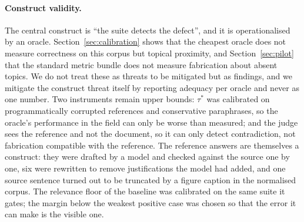 \documentclass[a4paper,fleqn]{cas-dc}
\begin{document}
\paragraph{Construct validity.} The central construct is ``the suite detects
the defect'', and it is operationalised by an oracle. Section~\ref{sec:calibration}
shows that the cheapest oracle does not measure correctness on this corpus but
topical proximity, and Section~\ref{sec:pilot} that the standard metric bundle
does not measure fabrication about absent topics. We do not treat these as
threats to be mitigated but as findings, and we mitigate the construct
threat itself by reporting adequacy per oracle and never as one number. Two
instruments remain upper bounds: $\tau^\ast$ was calibrated on
programmatically corrupted references and conservative paraphrases, so the
oracle's performance in the field can only be worse than measured; and the
judge sees the reference and not the document, so it can only detect
contradiction, not fabrication compatible with the reference. The reference
answers are themselves a construct: they were drafted by a model and checked
against the source one by one, six were rewritten to remove justifications
the model had added, and one source sentence turned out to be truncated by a
figure caption in the normalised corpus. The relevance floor of the baseline
was calibrated on the same suite it gates; the margin below the weakest
positive case was chosen so that the error it can make is the visible one.
\end{document}
